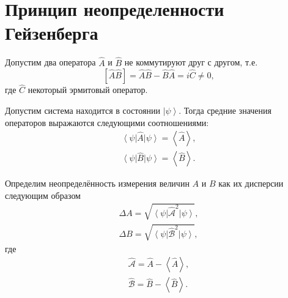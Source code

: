 \section{Принцип неопределенности Гейзенберга}
\label{AddHeisenbergUncertaintyPrinciple}
Допустим два оператора $\hat{A}$ и $\hat{B}$ не коммутируют друг с
другом, т.е. 
\begin{equation}
\left[
\hat{A}\hat{B}
\right] = 
\hat{A}\hat{B} - \hat{B}\hat{A} = i \hat{C} \ne 0,
\nonumber
\end{equation}
где $\hat{C}$ некоторый эрмитовый оператор.

Допустим система находится в состоянии $\left|\psi\right>$. Тогда
средние значения операторов выражаются следующими соотношениями:
\begin{eqnarray}
\left<\psi\right|\hat{A}\left|\psi\right> = \left<\hat{A}\right>,
\nonumber \\
\left<\psi\right|\hat{B}\left|\psi\right> = \left<\hat{B}\right>.
\nonumber
\end{eqnarray}

Определим неопределённость измерения величин $A$ и $B$ как их
дисперсии следующим образом
\begin{eqnarray}
\Delta A = \sqrt{\left<\psi\right|
\hat{\mathcal{A}}^2\left|\psi\right>}, 
\nonumber \\
\Delta B = \sqrt{\left<\psi\right|
\hat{\mathcal{B}}^2\left|\psi\right>}, 
\nonumber
\end{eqnarray}
где
\begin{eqnarray}
\hat{\mathcal{A}} = \hat{A}-\left<\hat{A}\right>, 
\nonumber \\
\hat{\mathcal{B}} = \hat{B}-\left<\hat{B}\right>.
\nonumber
\end{eqnarray}


